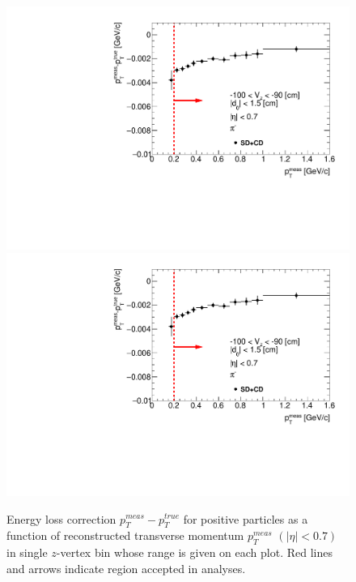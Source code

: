 \begin{figure}[H]
\caption[Energy loss correction for positive particles as a function of reconstructed transverse momentum $p_T^{meas}$.]{Energy loss correction $p_T^{meas}-p_T^{true}$ for positive particles as a function of reconstructed transverse momentum $p_T^{meas}$ $\left(|\eta|<0.7\right)$ in single $z$-vertex bin whose range is given on each plot. Red lines and arrows indicate region accepted in analyses.}\label{fig:energyLossPrimaryPositive}
\parbox{0.329\textwidth}{
  \includegraphics[width=\linewidth,page=143]{graphics/energyLoss/energyLoss3D_OnePrtAlso.pdf}\\
  \includegraphics[width=\linewidth,page=146]{graphics/energyLoss/energyLoss3D_OnePrtAlso.pdf}\\
}
\end{figure}
